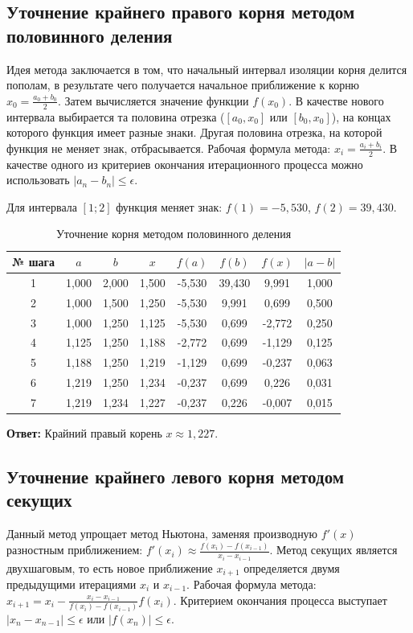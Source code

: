 \documentclass[a4paper,12pt]{article}
\begin{document}
\subsection{Уточнение крайнего правого корня методом половинного деления}

Идея метода заключается в том, что начальный интервал изоляции корня делится пополам, в результате чего получается начальное приближение к корню $x_0 = \frac{a_0 + b_0}{2}$. Затем вычисляется значение функции $f(x_0)$. В качестве нового интервала выбирается та половина отрезка ($[a_0, x_0]$ или $[b_0, x_0]$), на концах которого функция имеет разные знаки. Другая половина отрезка, на которой функция не меняет знак, отбрасывается. Рабочая формула метода: $x_i = \frac{a_i + b_i}{2}$. В качестве одного из критериев окончания итерационного процесса можно использовать $|a_n - b_n| \le \epsilon$.

Для интервала $[1; 2]$ функция меняет знак: $f(1) = -5,530$, $f(2) = 39,430$.

\begin{table}[H]
\centering
\begin{tabular}{|c|c|c|c|c|c|c|c|}
\hline
№ шага & $a$ & $b$ & $x$ & $f(a)$ & $f(b)$ & $f(x)$ & $|a-b|$ \\ \hline
1 & 1,000 & 2,000 & 1,500 & -5,530 & 39,430 & 9,991 & 1,000 \\ \hline
2 & 1,000 & 1,500 & 1,250 & -5,530 & 9,991 & 0,699 & 0,500 \\ \hline
3 & 1,000 & 1,250 & 1,125 & -5,530 & 0,699 & -2,772 & 0,250 \\ \hline
4 & 1,125 & 1,250 & 1,188 & -2,772 & 0,699 & -1,129 & 0,125 \\ \hline
5 & 1,188 & 1,250 & 1,219 & -1,129 & 0,699 & -0,237 & 0,063 \\ \hline
6 & 1,219 & 1,250 & 1,234 & -0,237 & 0,699 & 0,226 & 0,031 \\ \hline
7 & 1,219 & 1,234 & 1,227 & -0,237 & 0,226 & -0,007 & 0,015 \\ \hline
\end{tabular}
\caption{Уточнение корня методом половинного деления}
\end{table}
\textbf{Ответ:} Крайний правый корень $x \approx 1,227$.

\subsection{Уточнение крайнего левого корня методом секущих}

Данный метод упрощает метод Ньютона, заменяя производную $f'(x)$ разностным приближением: $f'(x_i) \approx \frac{f(x_i) - f(x_{i-1})}{x_i - x_{i-1}}$. Метод секущих является двухшаговым, то есть новое приближение $x_{i+1}$ определяется двумя предыдущими итерациями $x_i$ и $x_{i-1}$. Рабочая формула метода: $x_{i+1} = x_i - \frac{x_i - x_{i-1}}{f(x_i) - f(x_{i-1})} f(x_i)$. Критерием окончания процесса выступает $ |x_n - x_{n-1}| \le \epsilon $ или $ |f(x_n)| \le \epsilon $.
\end{document}
